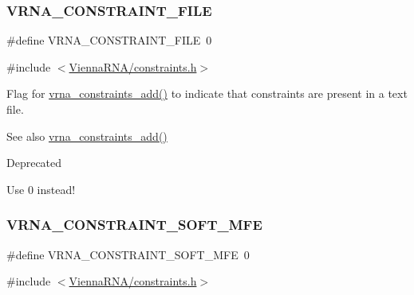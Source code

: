 \subsubsection{\texorpdfstring{V\+R\+N\+A\+\_\+\+C\+O\+N\+S\+T\+R\+A\+I\+N\+T\+\_\+\+F\+I\+LE}{VRNA\_CONSTRAINT\_FILE}}
{\footnotesize\ttfamily \#define V\+R\+N\+A\+\_\+\+C\+O\+N\+S\+T\+R\+A\+I\+N\+T\+\_\+\+F\+I\+LE~0}



{\ttfamily \#include $<$\mbox{\hyperlink{constraints_8h}{Vienna\+R\+N\+A/constraints.\+h}}$>$}



Flag for \mbox{\hyperlink{group__constraints_ga35a401f680969a556858a8dd5f1d07cc}{vrna\+\_\+constraints\+\_\+add()}} to indicate that constraints are present in a text file. 

\begin{DoxySeeAlso}{See also}
\mbox{\hyperlink{group__constraints_ga35a401f680969a556858a8dd5f1d07cc}{vrna\+\_\+constraints\+\_\+add()}} 
\end{DoxySeeAlso}
\begin{DoxyRefDesc}{Deprecated}
\item[\mbox{\hyperlink{deprecated__deprecated000040}{Deprecated}}]Use 0 instead!\end{DoxyRefDesc}
\mbox{\label{group__constraints_ga62aa195893d02d1a79ca94952748df36}} 
\subsubsection{\texorpdfstring{V\+R\+N\+A\+\_\+\+C\+O\+N\+S\+T\+R\+A\+I\+N\+T\+\_\+\+S\+O\+F\+T\+\_\+\+M\+FE}{VRNA\_CONSTRAINT\_SOFT\_MFE}}
{\footnotesize\ttfamily \#define V\+R\+N\+A\+\_\+\+C\+O\+N\+S\+T\+R\+A\+I\+N\+T\+\_\+\+S\+O\+F\+T\+\_\+\+M\+FE~0}



{\ttfamily \#include $<$\mbox{\hyperlink{constraints_8h}{Vienna\+R\+N\+A/constraints.\+h}}$>$}



